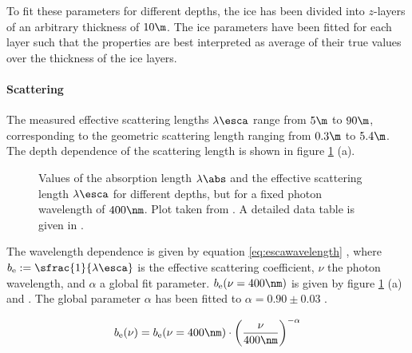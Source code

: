 To fit these parameters for different depths, the ice has been divided into $z$-layers of an arbitrary thickness of $10\m$. The ice parameters have been fitted for each layer such that the properties are best interpreted as average of their true values over the thickness of the ice layers. \cite{icepaper}


\paragraph{Scattering}
The measured effective scattering lengths $\lambda\esca$ range from $5\m$ to $90\m$, corresponding to the geometric scattering length ranging from $0.3\m$ to $5.4\m$. The depth dependence of the scattering length is shown in figure \ref{fig:Ahxobai3} (a). \cite{icepaper}

\begin{figure}[htbp]
  \hfill
  \caption{Values of the absorption length $\lambda\abs$ and the effective scattering length $\lambda\esca$ for different depths, but for a fixed photon wavelength of $400\nm$. Plot taken from \cite[figure 16]{icepaper}. A detailed data table is given in \cite[table C1]{icepaper}.}
  \label{fig:Ahxobai3}
\end{figure}


The wavelength dependence is given by equation \ref{eq:escawavelength} \cite[section 4]{icepaper}, where $b_\text{e} := \sfrac{1}{\lambda\esca}$ is the effective scattering coefficient, $\nu$ the photon wavelength, and $\alpha$ a global fit parameter. $b_\text{e}(\nu = 400\nm)$ is given by figure \ref{fig:Ahxobai3} (a) and \cite[table C4]{icepaper}. The global parameter $\alpha$ has been fitted to $\alpha = 0.90 \pm 0.03$ \cite[section 5.1]{ackermann}.

\begin{equation}
  b_\text{e}(\nu) = b_\text{e}(\nu = 400\nm) \cdot \left(\frac{\nu}{400\nm}\right)^{-\alpha}
  \label{eq:escawavelength}
\end{equation}

